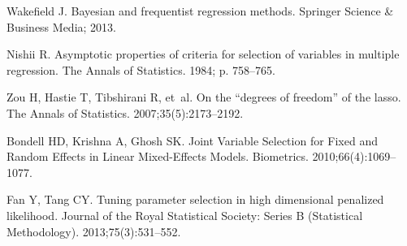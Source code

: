 \documentclass[10pt,letterpaper]{article}
\begin{document}
\begin{thebibliography}{10}
	Wakefield J.
	\newblock Bayesian and frequentist regression methods.
	\newblock Springer Science \& Business Media; 2013.
	
	Nishii R.
	\newblock Asymptotic properties of criteria for selection of variables in
	multiple regression.
	\newblock The Annals of Statistics. 1984; p. 758--765.
	
	Zou H, Hastie T, Tibshirani R, et~al.
	\newblock On the “degrees of freedom” of the lasso.
	\newblock The Annals of Statistics. 2007;35(5):2173--2192.
	
	Bondell HD, Krishna A, Ghosh SK.
	\newblock Joint Variable Selection for Fixed and Random Effects in Linear
	Mixed-Effects Models.
	\newblock Biometrics. 2010;66(4):1069--1077.
	
	Fan Y, Tang CY.
	\newblock Tuning parameter selection in high dimensional penalized likelihood.
	\newblock Journal of the Royal Statistical Society: Series B (Statistical
	Methodology). 2013;75(3):531--552.
	
\end{thebibliography}
\end{document}
